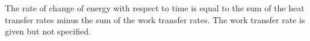 The rate of change of energy with respect to time is equal to the sum of the heat transfer rates minus the sum of the work transfer rates. The work transfer rate is given but not specified.